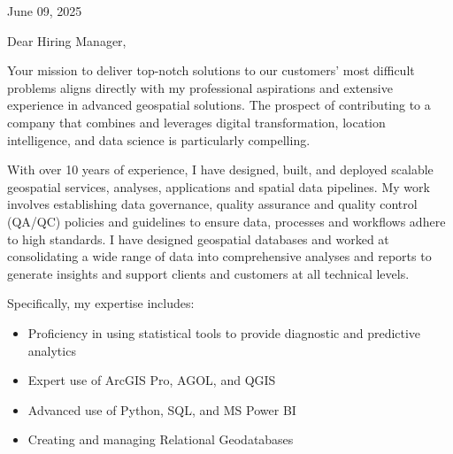 \documentclass[letterpaper]{article}
\newenvironment{itemlist}
        {
            \vspace{-12pt}
            \begin{itemize} \itemsep 0pt
        }{
            \end{itemize}
            \vspace{-3pt}
        }
\begin{document}
\large

\null\hfill June 09, 2025

Dear Hiring Manager,

Your mission to
deliver top-notch solutions to our customers’ most difficult problems
aligns directly with my professional aspirations and extensive experience in advanced geospatial solutions.
The prospect of contributing to a company that combines and leverages
digital transformation, location intelligence, and data science
is particularly compelling.

With over 10 years of experience, I have designed, built, and deployed scalable
geospatial services, analyses, applications and spatial data pipelines.
My work involves establishing data governance, quality assurance and quality control (QA/QC)
policies and guidelines to ensure data, processes and workflows adhere to high standards.
I have designed geospatial databases and worked at consolidating
a wide range of data into comprehensive analyses and reports to generate
insights and support clients and customers at all technical levels.

Specifically, my expertise includes:
\begin{itemlist}
\item Proficiency in using statistical tools to provide diagnostic and predictive analytics
\item Expert use of ArcGIS Pro, AGOL, and QGIS
\item Advanced use of Python, SQL, and MS Power BI
\item Creating and managing Relational Geodatabases
\end{itemlist}
\end{document}

